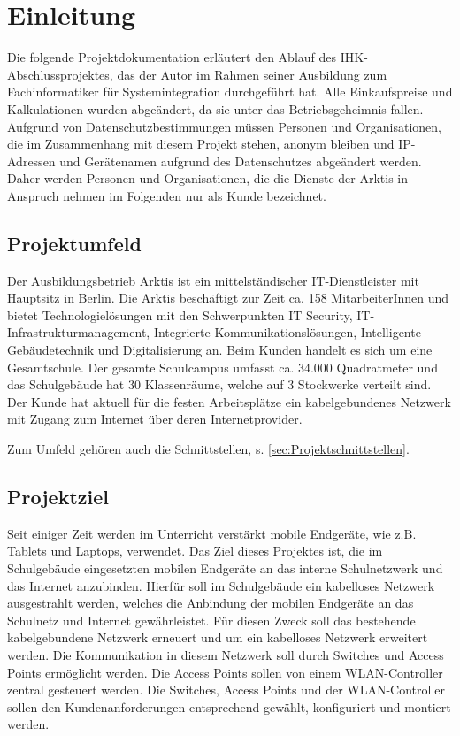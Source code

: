 \newpage
\section{Einleitung}
\label{sec:Einleitung}
Die folgende Projektdokumentation erläutert den Ablauf des IHK-Abschlussprojektes, das der Autor im Rahmen seiner Ausbildung zum Fachinformatiker für Systemintegration durchgeführt hat. 
Alle Einkaufspreise und Kalkulationen wurden abgeändert, da sie unter das Betriebsgeheimnis fallen. 
Aufgrund von Datenschutzbestimmungen müssen Personen und Organisationen, die im Zusammenhang mit diesem Projekt stehen, anonym bleiben und IP-Adressen und Gerätenamen aufgrund des Datenschutzes abgeändert werden. 
 Daher werden Personen und Organisationen, die die Dienste der \ac{Arktis} in Anspruch nehmen im Folgenden nur als Kunde bezeichnet. 

\subsection{Projektumfeld} 
\label{sec:Projektumfeld}
Der Ausbildungsbetrieb \acs{Arktis} ist ein mittelständischer IT-Dienstleister mit Hauptsitz in Berlin. Die \ac{Arktis} beschäftigt zur Zeit ca. 158 MitarbeiterInnen und bietet Technologielösungen mit den Schwerpunkten IT Security, IT-Infrastrukturmanagement, Integrierte Kommunikationslösungen, Intelligente Gebäudetechnik und Digitalisierung an. Beim Kunden handelt es sich um eine Gesamtschule. Der gesamte Schulcampus umfasst ca. 34.000 Quadratmeter und das Schulgebäude hat 30 Klassenräume, welche auf 3 Stockwerke verteilt sind. Der Kunde hat aktuell für die festen Arbeitsplätze ein kabelgebundenes Netzwerk mit Zugang zum Internet über deren Internetprovider.   

Zum Umfeld gehören auch die Schnittstellen, s. \ref{sec:Projektschnittstellen}.

\subsection{Projektziel} 
\label{sec:Projektziel}
Seit einiger Zeit werden im Unterricht verstärkt mobile Endgeräte, wie z.B. Tablets und Laptops, verwendet. 
Das Ziel dieses Projektes ist, die im Schulgebäude eingesetzten mobilen Endgeräte an das interne Schulnetzwerk und das Internet anzubinden. 
Hierfür soll im Schulgebäude ein kabelloses Netzwerk ausgestrahlt werden, welches die Anbindung der mobilen Endgeräte an das Schulnetz und Internet gewährleistet. 
Für diesen Zweck soll das bestehende kabelgebundene Netzwerk erneuert und um ein kabelloses Netzwerk erweitert werden. 
Die Kommunikation in diesem Netzwerk soll durch Switches und Access Points ermöglicht werden. 
Die Access Points sollen von einem WLAN-Controller zentral gesteuert werden. 
Die Switches, Access Points und der WLAN-Controller sollen den Kundenanforderungen entsprechend gewählt, konfiguriert und montiert werden.


